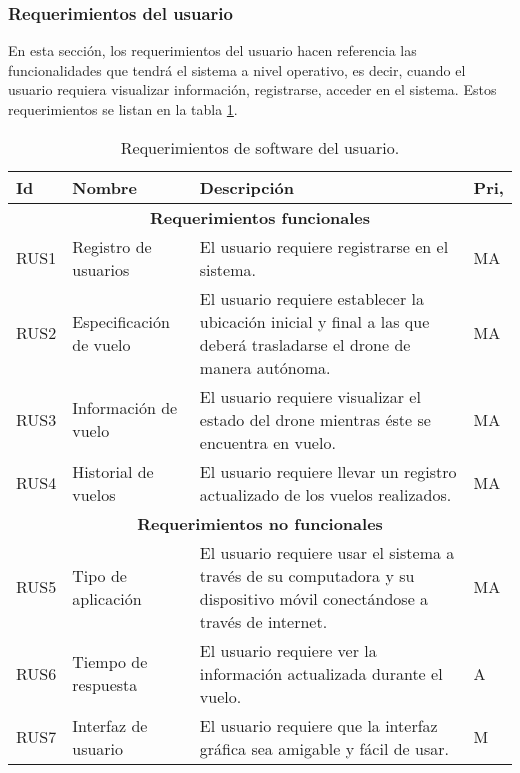 %

\subsubsection{Requerimientos del usuario}

En esta sección, los requerimientos del usuario hacen referencia las 
funcionalidades que tendrá el sistema a nivel operativo, es decir, cuando el 
usuario requiera visualizar información, registrarse, acceder en el sistema.
Estos requerimientos se listan en la tabla \ref{tab:req:soft:usuario}.

\begin{table}[H]
	\centering
	\caption{Requerimientos de software del usuario.}
	\label{tab:req:soft:usuario}
	\begin{tabular}{ | l | l | p{6.5cm} | l |}
		\hline
		\textbf{Id} & \textbf{Nombre} & \textbf{Descripción} & 
		\textbf{Pri,}
		\\\hline
		\multicolumn{4}{|c|}{\textbf{Requerimientos funcionales}} 
		\\\hline
		RUS1 & Registro de usuarios & El usuario requiere registrarse en 
		el sistema. 
		& MA
		\\\hline
		RUS2 & Especificación de vuelo & El usuario requiere establecer 
		la ubicación inicial y final a las que deberá trasladarse el 
		drone de manera autónoma. 
		& MA
		\\\hline
		RUS3 & Información de vuelo & El usuario requiere visualizar el 
		estado del drone mientras éste se encuentra en vuelo. 
		& MA
		\\\hline
		RUS4 & Historial de vuelos & El usuario requiere llevar un 
		registro actualizado de los vuelos realizados. 
		& MA
		\\\hline
		\multicolumn{4}{|c|}{\textbf{Requerimientos no funcionales}} 
		\\\hline
		RUS5 & Tipo de aplicación & El usuario requiere usar el sistema 
		a través de su computadora y su dispositivo móvil conectándose a 
		través de internet. & MA
		\\\hline
		RUS6 & Tiempo de respuesta & El usuario requiere ver la 
		información actualizada durante el vuelo. & A
		\\\hline
		RUS7 & Interfaz de usuario & El usuario requiere que la interfaz 
		gráfica sea amigable y fácil de usar. & M
		\\\hline
	\end{tabular}
\end{table}
